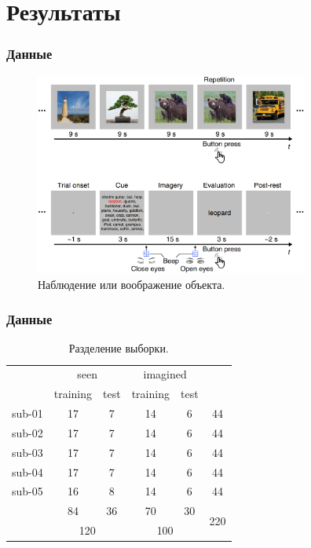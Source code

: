 \documentclass{beamer}
\begin{document}
	\section{Результаты}
	\begin{frame} 
		\frametitle{Данные}
		\begin{figure}
			\includegraphics[width=9cm]{../images/data_3.png}
			\caption{Наблюдение или воображение объекта.} 
			\label{fg:12}
		\end{figure}
	\end{frame}

	\begin{frame} 
		\frametitle{Данные}
		\vspace{0.5cm}
		
		\begin{table}[]
			\begin{tabular}{c|cc|cc|c}
				& \multicolumn{2}{c|}{seen}            & \multicolumn{2}{c|}{imagined}        &                      \\ \cline{2-5}
				& \multicolumn{1}{c|}{training} & test & \multicolumn{1}{c|}{training} & test &                      \\ \hline
				sub-01 & \multicolumn{1}{c|}{17}       & 7    & \multicolumn{1}{c|}{14}       & 6    & 44                   \\
				sub-02 & \multicolumn{1}{c|}{17}       & 7    & \multicolumn{1}{c|}{14}       & 6    & 44                   \\
				sub-03 & \multicolumn{1}{c|}{17}       & 7    & \multicolumn{1}{c|}{14}       & 6    & 44                   \\
				sub-04 & \multicolumn{1}{c|}{17}       & 7    & \multicolumn{1}{c|}{14}       & 6    & 44                   \\
				sub-05 & \multicolumn{1}{c|}{16}       & 8    & \multicolumn{1}{c|}{14}       & 6    & 44                   \\ \hline
				& \multicolumn{1}{c|}{84}       & 36   & \multicolumn{1}{c|}{70}       & 30   & \multirow{2}{*}{220} \\ \cline{2-5}
				& \multicolumn{2}{c|}{120}             & \multicolumn{2}{c|}{100}             &                     
			\end{tabular}
			
			\caption{Разделение выборки.} 
		\end{table}
	\end{frame}
	
\end{document}
